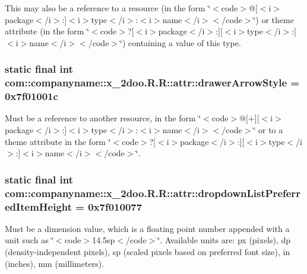This may also be a reference to a resource (in the form \char`\"{}$<$code$>$@\mbox{[}$<$i$>$package$<$/i$>$:\mbox{]}$<$i$>$type$<$/i$>$:$<$i$>$name$<$/i$>$$<$/code$>$\char`\"{}) or theme attribute (in the form \char`\"{}$<$code$>$?\mbox{[}$<$i$>$package$<$/i$>$:\mbox{]}\mbox{[}$<$i$>$type$<$/i$>$:\mbox{]}$<$i$>$name$<$/i$>$$<$/code$>$\char`\"{}) containing a value of this type. \hypertarget{classcom_1_1companyname_1_1x__2doo_1_1_r_1_1attr_2d7ba9346f3a266d207838e0ad9da05b}{
\subsubsection[{drawerArrowStyle}]{\setlength{\rightskip}{0pt plus 5cm}static final int com::companyname::x\_\-2doo.R.R::attr::drawerArrowStyle = 0x7f01001c}}
\label{classcom_1_1companyname_1_1x__2doo_1_1_r_1_1attr_2d7ba9346f3a266d207838e0ad9da05b}


Must be a reference to another resource, in the form \char`\"{}$<$code$>$@\mbox{[}+\mbox{]}\mbox{[}$<$i$>$package$<$/i$>$:\mbox{]}$<$i$>$type$<$/i$>$:$<$i$>$name$<$/i$>$$<$/code$>$\char`\"{} or to a theme attribute in the form \char`\"{}$<$code$>$?\mbox{[}$<$i$>$package$<$/i$>$:\mbox{]}\mbox{[}$<$i$>$type$<$/i$>$:\mbox{]}$<$i$>$name$<$/i$>$$<$/code$>$\char`\"{}. \hypertarget{classcom_1_1companyname_1_1x__2doo_1_1_r_1_1attr_c9b423ffc7a18773181edea893e59ad2}{
\subsubsection[{dropdownListPreferredItemHeight}]{\setlength{\rightskip}{0pt plus 5cm}static final int com::companyname::x\_\-2doo.R.R::attr::dropdownListPreferredItemHeight = 0x7f010077}}
\label{classcom_1_1companyname_1_1x__2doo_1_1_r_1_1attr_c9b423ffc7a18773181edea893e59ad2}


Must be a dimension value, which is a floating point number appended with a unit such as \char`\"{}$<$code$>$14.5sp$<$/code$>$\char`\"{}. Available units are: px (pixels), dp (density-independent pixels), sp (scaled pixels based on preferred font size), in (inches), mm (millimeters). 

